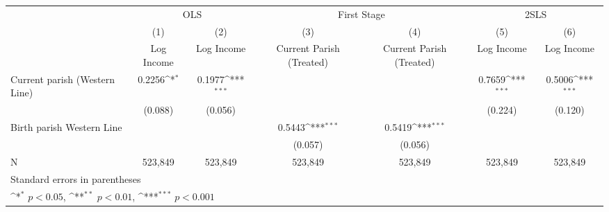 {
\def\sym#1{\ifmmode^{#1}\else\(^{#1}\)\fi}
\begin{tabular}{l*{6}{c}}
\hline\hline
                    &\multicolumn{2}{c}{OLS}                    &\multicolumn{2}{c}{First Stage}            &\multicolumn{2}{c}{2SLS}                   \\\cmidrule(lr){2-3}\cmidrule(lr){4-5}\cmidrule(lr){6-7}
                    &\multicolumn{1}{c}{(1)}&\multicolumn{1}{c}{(2)}&\multicolumn{1}{c}{(3)}&\multicolumn{1}{c}{(4)}&\multicolumn{1}{c}{(5)}&\multicolumn{1}{c}{(6)}\\
                    &\multicolumn{1}{c}{Log Income}&\multicolumn{1}{c}{Log Income}&\multicolumn{1}{c}{Current Parish (Treated)}&\multicolumn{1}{c}{Current Parish (Treated)}&\multicolumn{1}{c}{Log Income}&\multicolumn{1}{c}{Log Income}\\
\hline
Current parish (Western Line)&      0.2256\sym{*}  &      0.1977\sym{***}&                     &                     &      0.7659\sym{***}&      0.5006\sym{***}\\
                    &     (0.088)         &     (0.056)         &                     &                     &     (0.224)         &     (0.120)         \\
[1em]
Birth parish Western Line&                     &                     &      0.5443\sym{***}&      0.5419\sym{***}&                     &                     \\
                    &                     &                     &     (0.057)         &     (0.056)         &                     &                     \\
\hline
N                   &     523,849         &     523,849         &     523,849         &     523,849         &     523,849         &     523,849         \\
\hline\hline
\multicolumn{7}{l}{\footnotesize Standard errors in parentheses}\\
\multicolumn{7}{l}{\footnotesize \sym{*} \(p<0.05\), \sym{**} \(p<0.01\), \sym{***} \(p<0.001\)}\\
\end{tabular}
}
